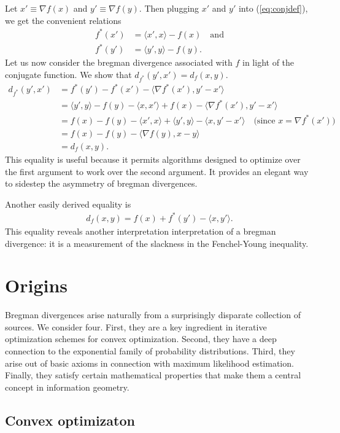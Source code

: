 \documentclass{article}
\begin{document}
Let $x' \equiv \nabla f(x)$ and $y' \equiv \nabla f(y)$.  
Then plugging $x'$ and $y'$ into (\ref{eq:conjdef}), we get the
convenient relations 
\begin{align*}
f^*(x') &= \langle x',x \rangle - f(x) \quad \mbox{and}\\
f^*(y') &= \langle y',y \rangle - f(y).
\end{align*}
Let us now consider the bregman divergence 
associated with $f$ in light of the conjugate function. We show
that $d_{f^*}(y',x') = 
d_f(x,y)$. 
\begin{align*}
d_{f^*}(y',x') &= f^*(y') - f^*(x') - \langle \nabla f^*(x'), y'-x'
\rangle \\
&= \langle y',y \rangle -f(y) - \langle x,x' \rangle + f(x) - \langle
\nabla f^*(x'), y'-x' \rangle\\
&= f(x) - f(y) -\langle x',x \rangle + \langle y',y
\rangle - \langle x,y' - x' \rangle \quad
\mbox{(since $x = \nabla f^*(x')$)}\\
&= f(x) - f(y) - \langle \nabla f(y),x-y \rangle \\
&= d_f(x,y).
\end{align*}
This equality is useful because it permits algorithms designed to
optimize over the first argument to work over the second argument.  It
provides an elegant way to sidestep the asymmetry of bregman
divergences.  

Another easily derived equality is 
\begin{align} 
d_f(x,y) = f(x) + f^*(y') - \langle x,y'\rangle . \label{eq:breg-youngs}
\end{align}
This equality reveals another interpretation interpretation of a
bregman divergence: it is a measurement of the slackness in the
Fenchel-Young inequality. 


\section{Origins}
Bregman divergences arise naturally
from a surprisingly disparate collection of sources.  We consider
four.  First, they are a key ingredient in iterative optimization
schemes for convex optimization.  Second, they have a deep connection
to the exponential family of probability distributions.  Third, they
arise out of basic axioms in connection with maximum likelihood
estimation.  Finally, they satisfy certain mathematical properties
that make them a central concept in information geometry.  
\subsection{Convex optimizaton}
\end{document}
